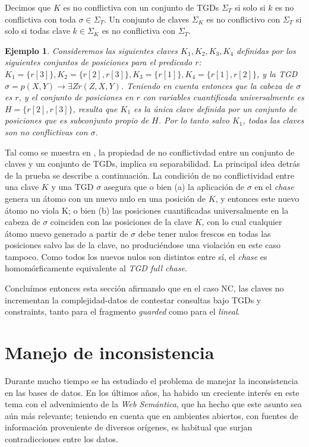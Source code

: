 \documentclass[11pt,a4paper,twoside]{tesis}
\newtheorem{exmp}{Ejemplo}
\begin{document}
Decimos que $K$ es no conflictiva con un conjunto de TGDs $\Sigma_T$ si solo si $k$ es no conflictiva con toda $\sigma \in \Sigma_T$. Un conjunto de claves $\Sigma_K$ es no conflictivo con $\Sigma_T$ si solo si todas clave $k \in \Sigma_K$ es no conflictiva con $\Sigma_T$.

\begin{exmp}
Consideremos las siguientes claves $K_1, K_2, K_3, K_4$ definidas por los siguientes conjuntos de posiciones para el predicado $r$: $K_1=\{r[3]\}, K_2=\{r[2], r[3]\}, K_3=\{r[1]\},  K_4=\{r[1], r[2]\}$, y la TGD $\sigma = p(X, Y) \rightarrow \exists Z r(Z, X, Y)$. Teniendo en cuenta entonces que la cabeza de $\sigma$ es $r$, y el conjunto de posiciones en $r$ con variables cuantificada universalmente es $H = \{r[2], r[3]\}$, resulta que $K_1$ es la única clave definida por un conjunto de posiciones que es subconjunto propio de $H$. Por lo tanto salvo $K_1$, todas las claves son no conflictivas con $\sigma$.
\end{exmp}

Tal como se muestra en \cite{JWS}, la propiedad de no conflictivdad entre un conjunto de claves y un conjunto de TGDs, implica su separabilidad. La principal idea detrás de la prueba se describe a continuación. La condición de no conflictividad entre una clave $K$ y una TGD $\sigma$ asegura que o bien (a) la aplicación de $\sigma$ en el \textit{chase} genera un átomo con un nuevo nulo en una posición de $K$, y entonces este nuevo átomo no viola K; o bien (b) las posiciones cuantificadas universalmente en la cabeza de $\sigma$ coinciden con las posiciones de la clave $K$, con lo cual cualquier átomo nuevo generado a partir de $\sigma$ debe tener nulos frescos en todas las posiciones salvo las de la clave, no produciéndose una violación en este caso tampoco. Como todos los nuevos nulos son distintos entre sí, el \textit{chase} es homomórficamente equivalente al \textit{TGD full chase}.

Concluímos entonces esta sección afirmando que en el caso NC, las claves no incrementan la complejidad-datos de contestar consultas bajo TGDs y constraints, tanto para el fragmento \textit{guarded} como para el \textit{lineal}.

\section{Manejo de inconsistencia}
Durante mucho tiempo se ha estudiado el problema de manejar la inconsistencia en las bases de datos. En los últimos años, ha habido un creciente interés en este tema con el advenimiento de la \textit{Web Semántica}, que ha hecho que este asunto sea aún más relevante; teniendo en cuenta que en ambientes abiertos, con fuentes de información proveniente de diversos orígenes, es habitual que surjan contradicciones entre los datos.
\end{document}
